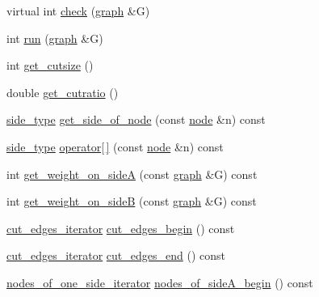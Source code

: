 \begin{DoxyCompactItemize}
\item 
virtual int \mbox{\hyperlink{classratio__cut__partition_a469c613c69db19cb63e492075346fea2}{check}} (\mbox{\hyperlink{classgraph}{graph}} \&G)
\item 
int \mbox{\hyperlink{classratio__cut__partition_a4ab180ca4cf57c811e3478c3de4c4dc3}{run}} (\mbox{\hyperlink{classgraph}{graph}} \&G)
\item 
int \mbox{\hyperlink{classratio__cut__partition_a4fc9beab107546850974ffd5a47c1e7f}{get\+\_\+cutsize}} ()
\item 
double \mbox{\hyperlink{classratio__cut__partition_a9a61b2be36953d57e36fbb511cf1aa96}{get\+\_\+cutratio}} ()
\item 
\mbox{\hyperlink{classratio__cut__partition_ace53442bd0c1e21fbf00858ec6f6b456}{side\+\_\+type}} \mbox{\hyperlink{classratio__cut__partition_a3b0a7dcc26c9ca25016abf2cebf250fe}{get\+\_\+side\+\_\+of\+\_\+node}} (const \mbox{\hyperlink{classnode}{node}} \&n) const
\item 
\mbox{\hyperlink{classratio__cut__partition_ace53442bd0c1e21fbf00858ec6f6b456}{side\+\_\+type}} \mbox{\hyperlink{classratio__cut__partition_a47358935eb416c38969b66fbf3f095b5}{operator\mbox{[}$\,$\mbox{]}}} (const \mbox{\hyperlink{classnode}{node}} \&n) const
\item 
int \mbox{\hyperlink{classratio__cut__partition_af68528cd0b199718e6b2f5fe8182e779}{get\+\_\+weight\+\_\+on\+\_\+sideA}} (const \mbox{\hyperlink{classgraph}{graph}} \&G) const
\item 
int \mbox{\hyperlink{classratio__cut__partition_abd0835eeaec80f5ba56de5428985259f}{get\+\_\+weight\+\_\+on\+\_\+sideB}} (const \mbox{\hyperlink{classgraph}{graph}} \&G) const
\item 
\mbox{\hyperlink{classratio__cut__partition_a910bb0e5c927ffd26a3805787e179194}{cut\+\_\+edges\+\_\+iterator}} \mbox{\hyperlink{classratio__cut__partition_a657a1d77b3b39037a52e6688674ad760}{cut\+\_\+edges\+\_\+begin}} () const
\item 
\mbox{\hyperlink{classratio__cut__partition_a910bb0e5c927ffd26a3805787e179194}{cut\+\_\+edges\+\_\+iterator}} \mbox{\hyperlink{classratio__cut__partition_a8609d76a4d74cb3b2596ac370c839fce}{cut\+\_\+edges\+\_\+end}} () const
\item 
\mbox{\hyperlink{classratio__cut__partition_af438a591f6559b479bf40e9ac9cfcf0e}{nodes\+\_\+of\+\_\+one\+\_\+side\+\_\+iterator}} \mbox{\hyperlink{classratio__cut__partition_a0c569bb7bd0a94269bd8938a2e0fce85}{nodes\+\_\+of\+\_\+side\+A\+\_\+begin}} () const
\item 

\end{DoxyCompactItemize}

